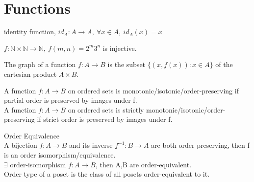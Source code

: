 \section{Functions}
	\begin{definition}
		identity function, $id_A:A \to A,\ \forall x \in A,\ id_A(x) = x$
	\end{definition}
	\begin{remark}
		$f:\mathbb{N}\times\mathbb{N}\to\mathbb{N},\ f(m,n)=2^m3^n$ is injective.\cite{bear1}
	\end{remark}
	\begin{definition}
		The graph of a function $f:A \to B$ is the subset $\{(x,f(x)) : x \in A \}$ of the cartesian product $A \times B$.
	\end{definition}
	\begin{definition}
		A function $f:A \to B$ on ordered sets is monotonic/isotonic/order-preserving if partial order is preserved by images under f.\\
		A function $f:A \to B$ on ordered sets is strictly monotonic/isotonic/order-preserving if strict order is preserved by images under f.
	\end{definition}
	\begin{definition}Order Equivalence\cite{josh1}\\
		A bijection $f:A \to B$ and its inverse $f^{-1}:B \to A$ are both order preserving, then f is an order isomorphism/equivalence.\\
		$\exists$ order-isomorphism $f:A \to B$, then A,B are order-equivalent.\\
		Order type of a poset is the class of all posets order-equivalent to it.
	\end{definition}
